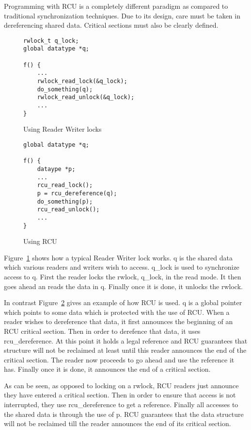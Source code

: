 Programming with RCU is a completely different paradigm as compared to traditional
synchronization techniques. Due to its design, care must be taken in dereferencing
shared data. Critical sections must also be clearly defined.


\begin{figure}[h]
\centering
\begin{lstlisting}
rwlock_t q_lock;
global datatype *q;

f() {
	...
	rwlock_read_lock(&q_lock);
	do_something(q);
	rwlock_read_unlock(&q_lock);
	...
}
\end{lstlisting}
\caption{Using Reader Writer locks}\label{fig:rwuse}
\end{figure}

\begin{figure}[h]
\centering
\begin{lstlisting}
global datatype *q;

f() {
	dataype *p;
	...
	rcu_read_lock();
	p = rcu_dereference(q);
	do_something(p);
	rcu_read_unlock();
	...
}
\end{lstlisting}
\caption{Using RCU}\label{fig:RCUuse}
\end{figure}

Figure~\ref{fig:rwuse} shows how a
typical Reader Writer lock works. q is the shared data which various readers
and writers wish to access. q\_lock is used to synchronize access to q.
First the reader locks the rwlock, q\_lock,
in the read mode. It then goes ahead an reads the data in q. Finally once it is
done, it unlocks the rwlock.

In contrast Figure~\ref{fig:RCUuse} gives an example of how RCU is used. q is a global pointer
which points to some data which is protected with the use of RCU. When a reader
wishes to dereference that data, it first announces the beginning of an RCU critical
section. Then in order to derefence that data, it uses rcu\_dereference. At this
point it holds a legal reference and RCU guarantees that structure will not be
reclaimed at least until this reader announces the end of the critical section.
The reader now proceeds to go ahead and use the reference it has. Finally once it
is done, it announces the end of a critical section.

As can be seen, as opposed to locking on a rwlock, RCU readers just announce they
have entered a critical section. Then in order to ensure that access is not
interrupted, they use rcu\_dereference to get a reference. Finally all accesses
to the shared data is through the use of p. RCU guarantees that the data structure
will not be reclaimed till the reader announces the end of its critical section.

